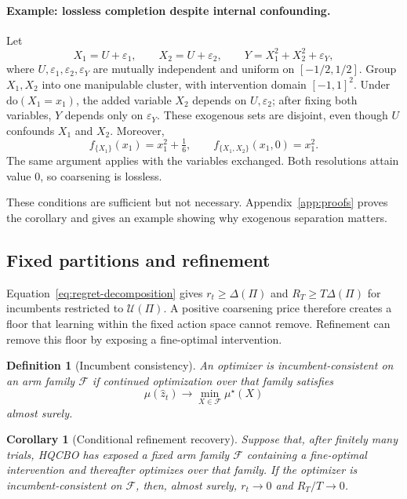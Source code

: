 \documentclass[twoside]{article}
\newtheorem{definition}{Definition}
\newtheorem{corollary}{Corollary}
\newcommand{\doo}{\mathrm{do}}
\begin{document}
\paragraph{Example: lossless completion despite internal confounding.}
Let
\[
X_1=U+\varepsilon_1,\qquad
X_2=U+\varepsilon_2,\qquad
Y=X_1^2+X_2^2+\varepsilon_Y,
\]
where \(U,\varepsilon_1,\varepsilon_2,\varepsilon_Y\) are mutually
independent and uniform on \([-1/2,1/2]\).
Group \(X_1,X_2\) into one manipulable cluster, with intervention
domain \([-1,1]^2\). Under \(\doo(X_1=x_1)\), the added variable
\(X_2\) depends on \(U,\varepsilon_2\); after fixing both variables,
\(Y\) depends only on \(\varepsilon_Y\). These exogenous sets are
disjoint, even though \(U\) confounds \(X_1\) and \(X_2\).
Moreover,
\[
f_{\{X_1\}}(x_1)=x_1^2+\tfrac16,
\qquad
f_{\{X_1,X_2\}}(x_1,0)=x_1^2.
\]
The same argument applies with the variables exchanged.
Both resolutions attain value \(0\), so coarsening is lossless.

These conditions are sufficient but not necessary.
Appendix~\ref{app:proofs} proves the corollary and gives an example
showing why exogenous separation matters.

\subsection{Fixed partitions and refinement}
\label{sec:refinement}
Equation~\eqref{eq:regret-decomposition} gives $r_t\ge\Delta(\Pi)$ and $R_T\ge T\Delta(\Pi)$ for incumbents restricted to $\mathcal U(\Pi)$. A positive coarsening price therefore creates a floor that learning within the fixed action space cannot remove. Refinement can remove this floor by exposing
a fine-optimal intervention.

\begin{definition}[Incumbent consistency]
\label{def:consistency}
An optimizer is incumbent-consistent on an arm family \(\mathcal F\)
if continued optimization over that family satisfies
\[
\mu(\hat z_t)\longrightarrow
\min_{X\in\mathcal F}\mu^\star(X)
\]
almost surely.
\end{definition}

\begin{corollary}[Conditional refinement recovery]
\label{cor:recovery}
Suppose that, after finitely many trials, HQCBO has exposed a fixed
arm family \(\mathcal F\) containing a fine-optimal intervention and
thereafter optimizes over that family. If the optimizer is
incumbent-consistent on \(\mathcal F\), then, almost surely, \(r_t\to0\) and \(R_T/T\to0\).
\end{corollary}
\end{document}
